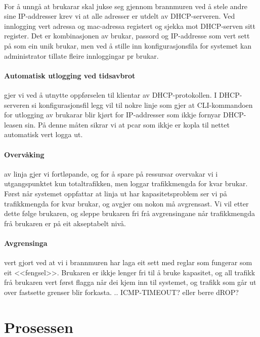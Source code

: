 \documentclass[nynorsk,12pt,a4paper,oneside]{book}
\begin{document}
\paragraph{} For å unngå at brukarar skal jukse seg gjennom brannmuren ved å stele andre sine IP-addresser krev vi at alle adresser er utdelt av DHCP-serveren. Ved innlogging vert adressa og mac-adressa registert og sjekka mot DHCP-serven sitt register. Det er kombinasjonen av brukar, passord og IP-addresse som vert sett på som ein unik brukar, men ved å stille inn konfigurasjonsfila for systemet kan administrator tillate fleire innloggingar pr brukar.

\paragraph{Automatisk utlogging ved tidsavbrot} gjer vi ved å utnytte oppførselen til klientar av DHCP-protokollen. I DHCP-serveren  si konfigurasjonsfil legg vil til nokre linje som gjer at CLI-kommandoen for utlogging av brukarar blir kjørt for IP-addresser som ikkje fornyar DHCP-leasen sin. På denne måten sikrar vi at pcar som ikkje er kopla til nettet automatisk vert logga ut. 

\paragraph{Overvåking} av linja gjer vi fortløpande, og for å spare på ressursar overvakar vi i utgangspunktet kun totaltrafikken, men loggar trafikkmengda for kvar brukar. Først når systemet oppfattar at linja ut har kapasitetsproblem ser vi på trafikkmengda for kvar brukar, og avgjer om nokon må avgrensast. Vi vil etter dette følge brukaren, og sleppe brukaren fri frå avgrensingane når trafikkmengda frå brukaren er på eit akseptabelt nivå. 

\paragraph{Avgrensinga} vert gjort ved at vi i brannmuren har laga eit sett med reglar som fungerar som eit <<fengsel>>. Brukaren er ikkje lenger fri til å bruke kapasitet, og all trafikk frå brukaren vert først flagga når dei kjem inn til systemet, og trafikk som går ut over fastsette grenser blir forkasta. .. ICMP-TIMEOUT? eller berre dROP?


\section{Prosessen}
\end{document}
